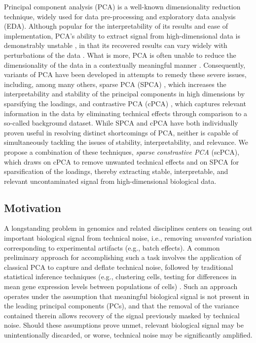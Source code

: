 Principal component analysis (PCA) is a well-known dimensionality reduction technique, widely used for data pre-processing and exploratory data analysis (EDA). Although popular for the interpretability of its results and ease of implementation, PCA's ability to extract signal from high-dimensional data is demonstrably unstable \citep{Shen2013,Johnstone2009}, in that its recovered results can vary widely with perturbations of the data \citep{yu2013}. What is more, PCA is often unable to reduce the dimensionality of the data in a contextually meaningful manner \citep{ringner2008,Abid2018}. Consequently, variants of PCA have been developed in attempts to remedy these severe issues, including, among many others, sparse PCA (SPCA) \citep{Zou2006}, which increases the interpretability and stability of the principal components in high dimensions by sparsifying the loadings, and contrastive PCA (cPCA) \citep{Abid2018}, which captures relevant information in the data by eliminating technical effects through comparison to a so-called background dataset. While SPCA and cPCA have both individually proven useful in resolving distinct shortcomings of PCA, neither is capable of simultaneously tackling the issues of stability, interpretability, and relevance. We propose a combination of these techniques, \textit{sparse constrastive PCA} (scPCA), which draws on cPCA to remove unwanted technical effects and on SPCA for sparsification of the loadings, thereby extracting stable, interpretable, and relevant uncontaminated signal from high-dimensional biological data.

\subsection{Motivation}

A longstanding problem in genomics and related disciplines centers on teasing out important biological signal from technical noise, i.e., removing \textit{unwanted} variation corresponding to experimental artifacts (e.g., batch effects). A common preliminary approach for accomplishing such a task involves the application of classical PCA to capture and deflate technical noise, followed by traditional statistical inference techniques (e.g., clustering cells, testing for differences in mean gene expression levels between populations of cells) \citep{Nguyen2019}. Such an approach operates under the assumption that meaningful biological signal is not present in the leading principal components (PCs), and that the removal of the variance contained therein allows recovery of the signal previously masked by technical noise. Should these assumptions prove unmet, relevant biological signal may be unintentionally discarded, or worse, technical noise may be significantly amplified.

